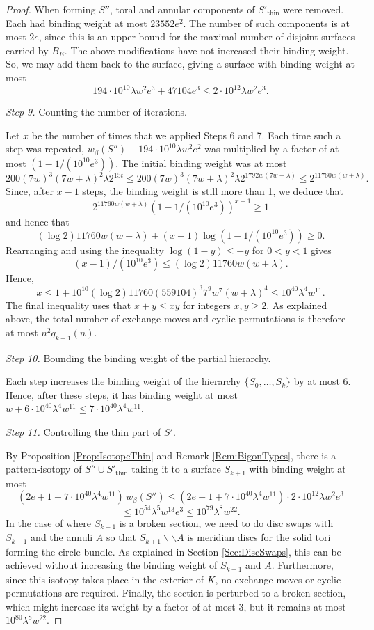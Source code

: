 \documentclass[oneside]{amsart}
\numberwithin{equation}{section}
\theoremstyle{plain}
\theoremstyle{definition}
\newcommand{\cut}{\backslash\backslash}
\begin{document}
\begin{proof}
When forming $S''$, toral and annular components of $S'_{\mathrm{thin}}$ were removed. Each had binding
weight at most $23552e^2$. The number of such components is at most $2e$, since this is an upper bound
for the maximal number of disjoint surfaces carried by $B_E$. The above modifications have not increased their binding weight.
So, we may add them back to the surface, giving a surface with binding weight at most
$$194 \cdot 10^{10} \lambda w^2 e^3 + 47104 e^3 \leq 2 \cdot 10^{12} \lambda w^2 e^3.$$

\medskip
\emph{Step 9.} Counting the number of iterations.

Let $x$ be the number of times that we applied Steps 6 and 7.
Each time such a step was repeated, $w_\beta(S'') - 194 \cdot 10^{10} \lambda w^2e^2$ was multiplied by 
a factor of at most $(1- 1/(10^{10} e^3))$. The initial binding weight was at most 
$$200(7w)^3(7w+\lambda)^2 \lambda 2^{15t}  \leq 200(7w)^3(7w+\lambda)^2 \lambda  2^{1792 w (7w + \lambda )} \leq 2^{11760 w(w+\lambda )}.$$
Since, after $x-1$ steps, the binding weight is still more than 1, we deduce that
$$2^{11760 w(w + \lambda )} (1-1/(10^{10}e^3))^{x-1} \geq 1$$
and hence that
$$(\log 2) 11760 w(w+\lambda ) + (x-1) \log  (1-1/(10^{10}e^3)) \geq 0.$$
Rearranging and using the inequality $\log(1-y) \leq - y$ for $0<y < 1$ gives
$$(x-1) / (10^{10} e^3) \leq (\log 2) 11760 w(w+ \lambda ).$$
Hence, 
$$x \leq 1+ 10^{10} (\log 2) 11760 (559104)^3 7^9 w^7 (w+\lambda )^4 \leq 10^{40} \lambda^4 w^{11}.$$
The final inequality uses that $x+y \leq xy$ for integers $x,y \geq 2$.
As explained above, the total number of exchange moves and cyclic permutations is therefore at most $n^2 q_{k+1}(n)$.

\medskip
\emph{Step 10.} Bounding the binding weight of the partial hierarchy.

Each step increases the binding weight of the hierarchy $\{S_0, \dots, S_k \}$ by at most 6.
Hence, after these steps, it has binding weight at most  $w + 6 \cdot 10^{40} \lambda^4 w^{11} \leq 7 \cdot 10^{40} \lambda^4 w^{11}$.

\medskip
\emph{Step 11.} Controlling the thin part of $S'$.

By Proposition \ref{Prop:IsotopeThin} and Remark \ref{Rem:BigonTypes}, there is a pattern-isotopy of $S'' \cup S'_{\mathrm{thin}}$ taking it to a surface 
$S_{k+1}$
with binding weight
at most 
$$(2e + 1 +  7 \cdot 10^{40} \lambda^4 w^{11}) \, w_\beta(S'') \leq (2e + 1 +  7 \cdot 10^{40} \lambda^4 w^{11}) \cdot 2 \cdot 10^{12} \lambda w^2 e^3$$
$$\leq 10^{54} \lambda^5 w^{13} e^3
\leq 10^{79} \lambda^8 w^{22}.$$ 
In the case of where $S_{k+1}$ is a broken section, we need to do disc swaps with $S_{k+1}$ and the
annuli $A$ so that $S_{k+1} \cut A$ is meridian discs for the solid tori forming the circle bundle.
As explained in Section \ref{Sec:DiscSwaps}, this can be achieved without increasing the binding weight
of $S_{k+1}$ and $A$. Furthermore, since this isotopy takes place in the exterior of $K$, no
exchange moves or cyclic permutations are required. Finally, the section is perturbed to a broken
section, which might increase its weight by a factor of at most $3$, but it remains at most 
$10^{80} \lambda^8 w^{22}$.
\end{proof}
\end{document}

